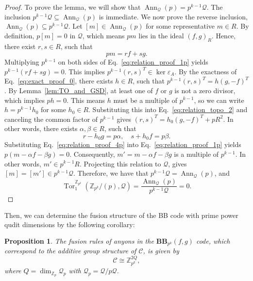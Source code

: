 \documentclass[aps,prb,english,superscriptaddress,twocolumn,tightenlines,showpacs,longbibliography,floatfix,amsfonts]{revtex4-2}
\newcommand{\eps}{\varepsilon}
\newtheorem{prop}{Proposition}
\begin{document}
\begin{proof}
    To prove the lemma, we will show that $\operatorname{Ann}_{\mathcal{Q}}(p) = p^{k-1}\mathcal{Q}$. The inclusion ${p^{k-1}\mathcal{Q}}\subseteq{\operatorname{Ann}_{\mathcal{Q}}(p)}$ is immediate. We now prove the reverse inclusion, ${\operatorname{Ann}_{\mathcal{Q}}(p)}\subseteq{p^{k-1}\mathcal{Q}}$. Let $[m]\in\operatorname{Ann}_{\mathcal{Q}}(p)$ for some representative $m\in R$. By definition, $p[m]=0$ in $\mathcal{Q}$, which means $pm$ lies in the ideal $(f,g)_R$. Hence, there exist $r,s\in R$, such that
    \begin{equation}
         pm=rf+sg.\label{eq:relation_proof_1p}
    \end{equation}
    Multiplying $p^{k-1}$ on both sides of Eq.~\eqref{eq:relation_proof_1p} yields $p^{k-1}(rf+sg)=0$. This implies $p^{k-1}(r,s)^T\in\ker\eps_{A}$. By the exactness of Eq.~\eqref{eq:exact_proof_0}, there exists $h\in R$, such that $p^{k-1}(r,s)^T=h(g,-f)^T$. By Lemma~\ref{lem:TO_and_GSD}, at least one of $f$ or $g$ is not a zero divisor, which implies $ph=0$. This means $h$ must be a multiple of $p^{k-1}$, so we can write $h=p^{k-1}h_0$ for some $h_0 \in R$. Substituting this into Eq.~\eqref{eq:relation_topo_2} and canceling the common factor of $p^{k-1}$ gives $(r,s)^T=h_0(g,-f)^T+pR^2$. In other words, there exists $\alpha,\beta\in R$, such that
    \begin{equation}
        r-h_0g=p\alpha,\quad s+h_0f=p\beta.\label{eq:relation_proof_4p}
    \end{equation}
    Substituting Eq.~\eqref{eq:relation_proof_4p} into Eq.~\eqref{eq:relation_proof_1p} yields $p(m-\alpha f-\beta g)=0$. Consequently, $m'=m-\alpha f-\beta g$ is a multiple of $p^{k-1}$. In other words, $m'\in p^{k-1} R$. Projecting this relation to $\mathcal{Q}$, gives $[m]=[m']\in p^{k-1}\mathcal{Q}$. Therefore, we have that $p^{k-1}\mathcal{Q}=\operatorname{Ann}_{\mathcal{Q}}(p)$, and
    \begin{equation}
        \operatorname{Tor}_1^{\mathbb{Z}_{p^k}}(\mathbb{Z}_{p^k}/(p),\mathcal{Q})=\frac{\operatorname{Ann}_{\mathcal{Q}}(p)}{p^{k-1}\mathcal{Q}}=0.\label{eq:tor2}
    \end{equation}
\end{proof}
Then, we can determine the fusion structure of the BB code with prime power qudit dimensions by the following corollary:
\begin{prop}
    The fusion rules of anyons in the $\mathbf{BB}_{p^k}(f,g)$ code, which correspond to the additive group structure of $\mathcal{C}$, is given by
    \begin{equation}
        \mathcal{C}\cong\mathbb{Z}_{p^k}^{2Q},
    \end{equation}
    where $Q=\dim_{\mathbb{Z}_p}\mathcal{Q}_p$ with $\mathcal{Q}_p=\mathcal{Q}/p\mathcal{Q}$.\label{cor:zpk_fusion}
\end{prop}
\end{document}
